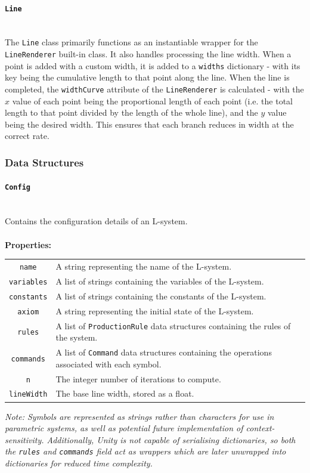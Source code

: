 \documentclass[12pt]{article}
\begin{document}
\paragraph{{\large\texttt{Line}}}\mbox{} \\
The \texttt{Line} class primarily functions as an instantiable wrapper for the \texttt{LineRenderer} built-in class. It also handles processing the line width. When a point is added with a custom width, it is added to a \texttt{widths} dictionary - with its key being the cumulative length to that point along the line. When the line is completed, the \texttt{widthCurve} attribute of the \texttt{LineRenderer} is calculated - with the \(x\) value of each point being the proportional length of each point (i.e. the total length to that point divided by the length of the whole line), and the \(y\) value being the desired width. This ensures that each branch reduces in width at the correct rate.
\pagebreak
\subsubsection{Data Structures}

\paragraph{{\large\texttt{Config}}}\mbox{} \\
Contains the configuration details of an L-system.\\\\
\textbf{Properties: }
\begin{center}
\begin{tabular}{c p{12cm}}
\texttt{name}& A string representing the name of the L-system.\\
\texttt{variables}& A list of strings containing the variables of the L-system.\\
\texttt{constants}& A list of strings containing the constants of the L-system. \\
\texttt{axiom}& A string representing the initial state of the L-system. \\
\texttt{rules}& A list of \texttt{ProductionRule} data structures containing the rules of the system. \\
\texttt{commands} & A list of \texttt{Command} data structures containing the operations associated with each symbol.\\
\texttt{n} & The integer number of iterations to compute.\\
\texttt{lineWidth} & The base line width, stored as a float.\\
\end{tabular}
\end{center}
\textit{Note: Symbols are represented as strings rather than characters for use in parametric systems, as well as potential future implementation of context-sensitivity. Additionally, Unity is not capable of serialising dictionaries, so both the \texttt{rules} and \texttt{commands} field act as wrappers which are later unwrapped into dictionaries for reduced time complexity.}\\
\end{document}
